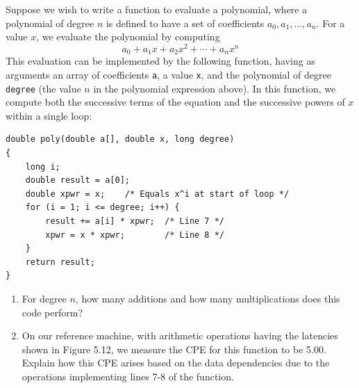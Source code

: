 \documentclass[12pt]{article}
\newenvironment{ex}[2][Exercise]{\begin{trivlist}
		\item[\hskip \labelsep {\bfseries #1}\hskip \labelsep {\bfseries #2.}]}{\end{trivlist}}
\begin{document}
\begin{ex}{5.5}
	Suppose we wish to write a function to evaluate a polynomial, where a polynomial of degree
	$n$ is defined to have a set of coefficients $a_0,a_1,\ldots,a_n$. For a value $x$, we
	evaluate the polynomial by computing
	\[
	a_0+a_1x+a_2x^2+\cdots+a_nx^n
	\]
	This evaluation can be implemented by the following function, having as arguments an array
	of coefficients \texttt{a}, a value \texttt{x}, and the polynomial of degree \texttt{degree}
	(the value $n$ in the polynomial expression above). In this function, we compute both the
	successive terms of the equation and the successive powers of $x$ within a single loop:
	\begin{lstlisting}
double poly(double a[], double x, long degree)
{
	long i;
	double result = a[0];
	double xpwr = x;	/* Equals x^i at start of loop */
	for (i = 1; i <= degree; i++) {
		result += a[i] * xpwr;	/* Line 7 */
		xpwr = x * xpwr;		/* Line 8 */
	}
	return result;
}
	\end{lstlisting}
	\begin{enumerate}[label=(\alph*)]
		\item For degree $n$, how many additions and how many multiplications does this code
		perform?
		\item On our reference machine, with arithmetic operations having the latencies shown in
		Figure 5.12, we measure the CPE for this function to be 5.00. Explain how this CPE arises
		based on the data dependencies due to the operations implementing lines 7-8 of the
		function.
	\end{enumerate}
\end{ex}
\end{document}
